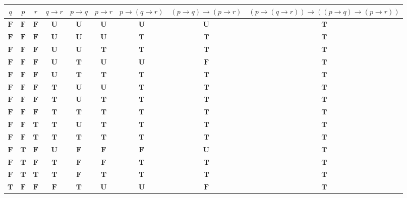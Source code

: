\documentclass[12pt]{article}
\begin{document}
{\begin{longtable}[]{@{}ccccccccc@{}}
\toprule
\(q\) & \(p\) & \(r\) & \(q \to r\) & \(p \to q\)& \(p \to r\) & \(p \to (q \to r)\) & 
\((p \to q) \to (p \to r)\) & \((p \to (q \to r)) \to ((p \to q) \to (p \to r))\)
\tabularnewline
\midrule
\endhead
\(\textbf{F}\) & \(\textbf{F}\) & \(\textbf{F}\) & \(\textbf{U}\) & \(\textbf{U}\) & \(\textbf{U}\) & \(\textbf{U}\) & \(\textbf{U}\) & \(\textbf{T}\) \tabularnewline
\(\textbf{F}\) & \(\textbf{F}\) & \(\textbf{F}\) & \(\textbf{U}\) & \(\textbf{U}\) & \(\textbf{U}\) & \(\textbf{T}\) & \(\textbf{T}\) & \(\textbf{T}\) \tabularnewline
\(\textbf{F}\) & \(\textbf{F}\) & \(\textbf{F}\) & \(\textbf{U}\) & \(\textbf{U}\) & \(\textbf{T}\) & \(\textbf{T}\) & \(\textbf{T}\) & \(\textbf{T}\) \tabularnewline
\(\textbf{F}\) & \(\textbf{F}\) & \(\textbf{F}\) & \(\textbf{U}\) & \(\textbf{T}\) & \(\textbf{U}\) & \(\textbf{U}\) & \(\textbf{F}\) & \(\textbf{T}\) \tabularnewline
\(\textbf{F}\) & \(\textbf{F}\) & \(\textbf{F}\) & \(\textbf{U}\) & \(\textbf{T}\) & \(\textbf{T}\) & \(\textbf{T}\) & \(\textbf{T}\) & \(\textbf{T}\) \tabularnewline
\(\textbf{F}\) & \(\textbf{F}\) & \(\textbf{F}\) & \(\textbf{T}\) & \(\textbf{U}\) & \(\textbf{U}\) & \(\textbf{T}\) & \(\textbf{T}\) & \(\textbf{T}\) \tabularnewline
\(\textbf{F}\) & \(\textbf{F}\) & \(\textbf{F}\) & \(\textbf{T}\) & \(\textbf{U}\) & \(\textbf{T}\) & \(\textbf{T}\) & \(\textbf{T}\) & \(\textbf{T}\) \tabularnewline
\(\textbf{F}\) & \(\textbf{F}\) & \(\textbf{F}\) & \(\textbf{T}\) & \(\textbf{T}\) & \(\textbf{T}\) & \(\textbf{T}\) & \(\textbf{T}\) & \(\textbf{T}\) \tabularnewline
\(\textbf{F}\) & \(\textbf{F}\) & \(\textbf{T}\) & \(\textbf{T}\) & \(\textbf{U}\) & \(\textbf{T}\) & \(\textbf{T}\) & \(\textbf{T}\) & \(\textbf{T}\) \tabularnewline
\(\textbf{F}\) & \(\textbf{F}\) & \(\textbf{T}\) & \(\textbf{T}\) & \(\textbf{T}\) & \(\textbf{T}\) & \(\textbf{T}\) & \(\textbf{T}\) & \(\textbf{T}\) \tabularnewline
\(\textbf{F}\) & \(\textbf{T}\) & \(\textbf{F}\) & \(\textbf{U}\) & \(\textbf{F}\) & \(\textbf{F}\) & \(\textbf{F}\) & \(\textbf{U}\) & \(\textbf{T}\) \tabularnewline
\(\textbf{F}\) & \(\textbf{T}\) & \(\textbf{F}\) & \(\textbf{T}\) & \(\textbf{F}\) & \(\textbf{F}\) & \(\textbf{T}\) & \(\textbf{T}\) & \(\textbf{T}\) \tabularnewline
\(\textbf{F}\) & \(\textbf{T}\) & \(\textbf{T}\) & \(\textbf{T}\) & \(\textbf{F}\) & \(\textbf{T}\) & \(\textbf{T}\) & \(\textbf{T}\) & \(\textbf{T}\) \tabularnewline
\(\textbf{T}\) & \(\textbf{F}\) & \(\textbf{F}\) & \(\textbf{F}\) & \(\textbf{T}\) & \(\textbf{U}\) & \(\textbf{U}\) & \(\textbf{F}\) & \(\textbf{T}\) \tabularnewline

\end{longtable}}
\end{document}
